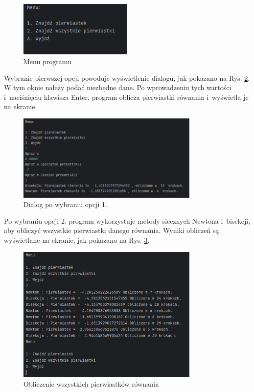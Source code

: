 \documentclass[12pt]{article}
\begin{document}
\begin{figure}[H]
\centering
\includegraphics[width=0.5\textwidth]{menu.png}
\caption{Menu programu}
\label{fig:menu}
\end{figure}
Wybranie pierwszej opcji powoduje wyświetlenie dialogu, jak pokazano na Rys. \ref{fig:dialog}. W tym oknie należy podać niezbędne dane. Po wprowadzeniu tych wartości i~naciśnięciu klawisza Enter, program oblicza pierwiastki równania i~wyświetla je na ekranie.
\begin{figure}[H]
\centering
\includegraphics[width=0.8\textwidth]{menu1.png}
\caption{Dialog po wybraniu opcji 1.}
\label{fig:dialog}
\end{figure}
Po wybraniu opcji 2. program wykorzystuje metody siecznych Newtona i~bisekcji, aby obliczyć wszystkie pierwiastki danego równania. Wyniki obliczeń są wyświetlane na ekranie, jak pokazano na Rys. \ref{fig:metody}.
\begin{figure}[H]
\centering
\includegraphics[width=0.8\textwidth]{menu2.png}
\caption{Obliczenie wszystkich pierwiastków równania}
\label{fig:metody}
\end{figure}
\end{document}
